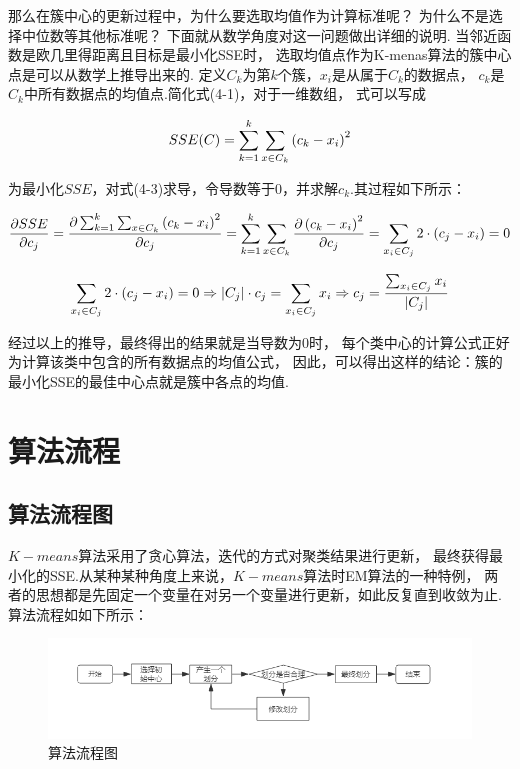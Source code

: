 \documentclass[bachelor,adobefonts]{jnuthesis}
\begin{document}
那么在簇中心的更新过程中，为什么要选取均值作为计算标准呢？
为什么不是选择中位数等其他标准呢？
下面就从数学角度对这一问题做出详细的说明.
当邻近函数是欧几里得距离且目标是最小化SSE时，
选取均值点作为K-menas算法的簇中心点是可以从数学上推导出来的.
定义$C_k$为第$k$个簇，$x_i$是从属于$C_k$的数据点，
$c_k$是$C_k$中所有数据点的均值点.简化式(4-1)，对于一维数组，
式可以写成

\begin{equation}
  \centering
  SSE(C) = \sum_{k=1}^{k}\sum_{x \in C_k}\left(c_k-x_i\right)^2
\end{equation}

为最小化$SSE$，对式(4-3)求导，令导数等于0，并求解$c_k$.其过程如下所示：

\begin{equation}
  \centering
  \frac{\partial SSE}{\partial c_j} = 
  \frac{\partial \sum_{k=1}^{k}\sum_{x \in C_k}\left(c_k-x_i\right)^2}
  {\partial c_j} = \sum_{k=1}^{k}\sum_{x \in C_k} 
  \frac{\partial \left(c_k-x_i\right)^2}{\partial c_j} = 
  \sum_{x_i \in C_j} 2 \cdot \left(c_j - x_i\right) = 0
\end{equation}

\begin{equation}
  \centering
  \sum_{x_i \in C_j} 2 \cdot  \left( c_j - x_i \right) = 0 
  \Rightarrow 
  \vert C_j \vert \cdot c_j = \sum_{x_i \in C_j} x_i 
  \Rightarrow 
  c_j = \frac {\sum_{x_i \in C_j} x_i }{\vert C_j \vert}
\end{equation}

经过以上的推导，最终得出的结果就是当导数为0时，
每个类中心的计算公式正好为计算该类中包含的所有数据点的均值公式，
因此，可以得出这样的结论：簇的最小化SSE的最佳中心点就是簇中各点的均值.


\section{算法流程}
\subsection{算法流程图}
$K-means$算法采用了贪心算法，迭代的方式对聚类结果进行更新，
最终获得最小化的SSE.从某种某种角度上来说，$K-means$算法时EM算法的一种特例，
两者的思想都是先固定一个变量在对另一个变量进行更新，如此反复直到收敛为止.
算法流程如如下所示：

\begin{figure}[h!]
  \centering
    \includegraphics[width=1.0\linewidth]{Wsuanfaliuchengtu.png}
  \caption{算法流程图}
\end{figure}
\end{document}

